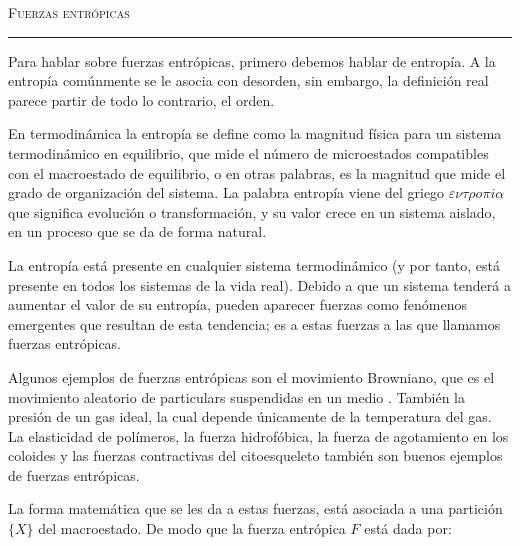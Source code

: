 \documentclass[11pt]{article}
\date{}
\newcommand{\myName}{Fuerzas entrópicas}
\theoremstyle{Tema} \newtheorem{Tema}{Tema} %
\theoremstyle{Tema} \newtheorem{Serie}{Serie}              %
\theoremstyle{Tema} \newtheorem{Ejercicio}{Ejercicio}    %
\begin{document}
\pagestyle{allStyle}

\thispagestyle{firststyle}
\begin{center}
\LARGE
\textsc{\myName} %
\medskip
\hrule height 1.5pt
\end{center}


\vspace{0.1 in}

Para hablar sobre fuerzas entrópicas, primero debemos hablar de entropía.
A la entropía comúnmente se le asocia con desorden, sin embargo, la definición real parece partir de todo lo contrario, el orden.

En termodinámica la entropía se define como la magnitud física para un sistema termodinámico en equilibrio, que mide el número de microestados compatibles con el macroestado de equilibrio, o en otras palabras, es la magnitud que mide el grado de organización del sistema. La palabra entropía viene del griego $\varepsilon\nu\tau\rho o \pi i\alpha$ que significa evolución o transformación, y su valor crece en un sistema aislado, en un proceso que se da de forma natural. \cite{WikiEntropy}

\bigskip

La entropía está presente en cualquier sistema termodinámico (y por tanto, está presente en todos los sistemas de la vida real). Debido a que un sistema tenderá a aumentar el valor de su entropía, pueden aparecer fuerzas como fenómenos emergentes que resultan de esta tendencia; es a estas fuerzas a las que llamamos fuerzas entrópicas. \cite{HandWiki-EntropicForce}

Algunos ejemplos \cite{Wiki-EntropicForce} de fuerzas entrópicas son el movimiento Browniano, que es el movimiento aleatorio de particulars suspendidas en un medio \cite{Wiki-Brownian}. También la presión de un gas ideal, la cual depende únicamente de la temperatura del gas. La elasticidad de polímeros, la fuerza hidrofóbica, la fuerza de agotamiento en los coloides y las fuerzas contractivas del citoesqueleto también son buenos ejemplos de fuerzas entrópicas.

La forma matemática que se les da a estas fuerzas, está asociada a una partición $\{X\}$ del macroestado. De modo que la fuerza entrópica $F$ está dada por:
\end{document}
